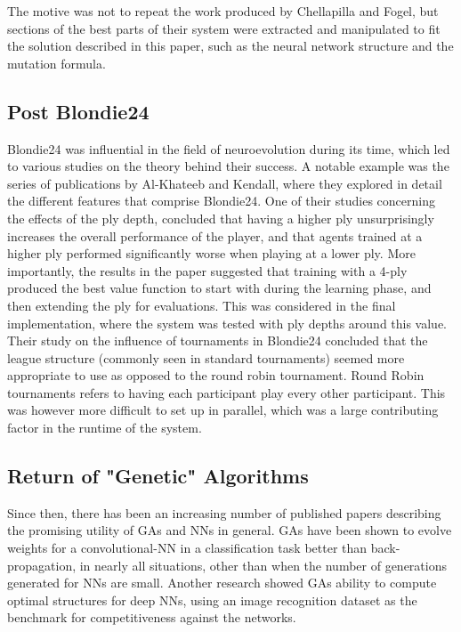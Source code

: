\documentclass[12pt,a4paper]{article}
\begin{document}
        The motive was not to repeat the work produced by Chellapilla and Fogel, but sections of the best parts of their system were extracted and manipulated to fit the solution described in this paper, such as the neural network structure and the mutation formula. 

    \subsection{Post Blondie24}

        Blondie24 was influential in the field of neuroevolution during its time, which led to various studies on the theory behind their success. A notable example was the series of publications by Al-Khateeb and Kendall, where they explored in detail the different features that comprise Blondie24. One of their studies concerning the effects of the ply depth, concluded that having a higher ply unsurprisingly increases the overall performance of the player, and that agents trained at a higher ply performed significantly worse when playing at a lower ply. More importantly, the results in the paper suggested that training with a 4-ply produced the best value function to start with during the learning phase, and then extending the ply for evaluations. \cite{al-khateeb_effect_2012} This was considered in the final implementation, where the system was tested with ply depths around this value. 
        Their study on the influence of tournaments in Blondie24 concluded that the league structure (commonly seen in standard tournaments) seemed more appropriate to use as opposed to the round robin tournament. \cite{al-khateeb_introducing_2009} Round Robin tournaments refers to having each participant play every other participant. This was however more difficult to set up in parallel, which was a large contributing factor in the runtime of the system.
    
    \subsection{Return of "Genetic" Algorithms}

        Since then, there has been an increasing number of published papers describing the promising utility of GAs and NNs in general. GAs have been shown to evolve weights for a convolutional-NN in a classification task better than back-propagation, in nearly all situations, other than when the number of generations generated for NNs are small. \cite{perez_apply_nodate} Another research showed GAs ability to compute optimal structures for deep NNs, using an image recognition dataset as the benchmark for competitiveness against the networks. \cite{xie_genetic_2017}
\end{document}

